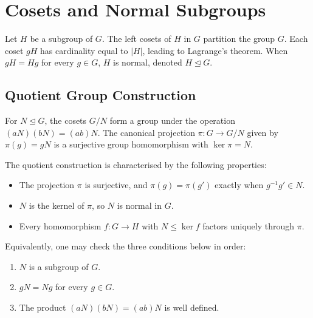 \documentclass[11pt]{article}
\theoremstyle{definition}
\theoremstyle{plain}
\begin{document}
\section{Cosets and Normal Subgroups}

Let $H$ be a subgroup of $G$. The left cosets of $H$ in $G$ partition the group $G$.
Each coset $gH$ has cardinality equal to $|H|$, leading to Lagrange's theorem.
When $gH = Hg$ for every $g \in G$, $H$ is normal, denoted $H \trianglelefteq G$.

\subsection{Quotient Group Construction}

For $N \trianglelefteq G$, the cosets $G/N$ form a group under the operation
$(aN)(bN) = (ab)N$. The canonical projection $\pi : G \to G/N$ given by $\pi(g) = gN$
is a surjective group homomorphism with $\ker \pi = N$.

The quotient construction is characterised by the following properties:

\begin{itemize}
  \item The projection $\pi$ is surjective, and $\pi(g) = \pi(g')$ exactly when
        $g^{-1}g' \in N$.
  \item $N$ is the kernel of $\pi$, so $N$ is normal in $G$.
  \item Every homomorphism $f : G \to H$ with $N \le \ker f$ factors uniquely
        through $\pi$.
\end{itemize}

Equivalently, one may check the three conditions below in order:

\begin{enumerate}
  \item $N$ is a subgroup of $G$.
  \item $gN = Ng$ for every $g \in G$.
  \item The product $(aN)(bN) = (ab)N$ is well defined.
\end{enumerate}
\end{document}
